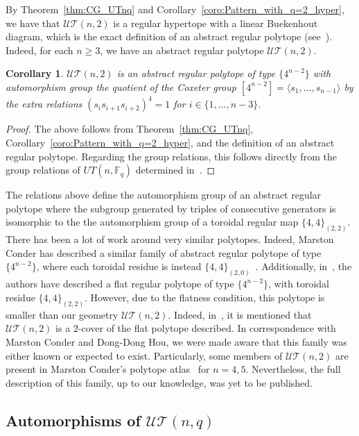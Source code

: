 \documentclass[11pt,letterpaper]{amsart}
\newtheorem{coro}[theorem]{Corollary}
\newcommand{\TT}{\mathcal{T}}
\newcommand{\FF}{\mathbb{F}}
\newcommand{\UU}{\mathcal{U}}
\begin{document}
By Theorem~\ref{thm:CG_UTnq} and Corollary~\ref{coro:Pattern_with_q=2_hyper}, we have that $\UU\TT(n,2)$ is a regular hypertope with a linear Buekenhout diagram, which is the exact definition of an abstract regular polytope (see~\cite{hypertopes}). Indeed, for each $n\geq 3$, we have an abstract regular polytope $\UU\TT(n,2)$.

\begin{coro}
    $\UU\TT(n,2)$ is an abstract regular polytope of type $\{4^{n-2}\}$ with automorphism group the quotient of the Coxeter group $[4^{n-2}]=\langle s_1,\ldots,s_{n-1}\rangle$ by the extra relations
    $(s_is_{i+1}s_{i+2})^4=1$ for $i\in\{1,\ldots,n-3\}$.
\end{coro}
\begin{proof}
    The above follows from Theorem~\ref{thm:CG_UTnq}, Corollary~\ref{coro:Pattern_with_q=2_hyper}, and the definition of an abstract regular polytope.
    Regarding the group relations, this follows directly from the group relations of $UT(n,\FF_q)$ determined in~\cite[Theorem 1]{biss2001presentation}.
\end{proof}

The relations above define the automorphism group of an abstract regular polytope where the subgroup generated by triples of consecutive generators is isomorphic to the the automorphism group of a toroidal regular map $\{4,4\}_{(2,2)}$.
There has been a lot of work around very similar polytopes. Indeed, Marston Conder has described a similar family of abstract regular polytope of type $\{4^{n-2}\}$, where each toroidal residue is instead $\{4,4\}_{(2,0)}$~\cite{Conder2013}. Additionally, in~\cite{Cunningham2026}, the authors have described a flat regular polytope of type $\{4^{n-2}\}$, with toroidal residue $\{4,4\}_{(2,2)}$. However, due to the flatness condition, this polytope is smaller than our geometry $\UU\TT(n,2)$. Indeed, in~\cite{Cunningham2026}, it is mentioned that $\UU\TT(n,2)$ is a $2$-cover of the flat polytope described.
In correspondence with Marston Conder and Dong-Dong Hou, we were made aware that this family was either known or expected to exist.
Particularly, some members of $\UU\TT(n,2)$ are present in Marston Conder's polytope atlas~\cite{ConderAtlas} for $n=4,5$. Nevertheless, the full description of this family, up to our knowledge, was yet to be published. 




\subsection{Automorphisms of $\UU\TT(n,q)$}
\end{document}
